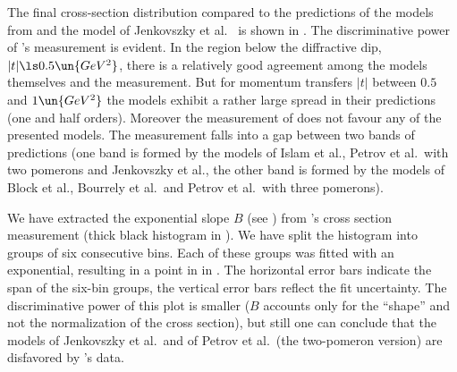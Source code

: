 The final cross-section distribution compared to the predictions of the models from  and the model of Jenkovszky et al.~ is shown in . The discriminative power of 's measurement is evident. In the region below the diffractive dip, $|t| \ls 0.5\un{GeV^2}$, there is a relatively good agreement among the models themselves and the measurement. But for momentum transfers $|t|$ between $0.5$ and $1\un{GeV^2}$ the models exhibit a rather large spread in their predictions (one and half orders). Moreover the measurement of  does not favour any of the presented models. The measurement falls into a gap between two bands of predictions (one band is formed by the models of Islam et al., Petrov et al.~with two pomerons and Jenkovszky et al., the other band is formed by the models of Block et al., Bourrely et al.~and Petrov et al.~with three pomerons).


We have extracted the exponential slope $B$ (see ) from 's cross section measurement (thick black histogram in ). We have split the histogram into groups of six consecutive bins. Each of these groups was fitted with an exponential, resulting in a point in in . The horizontal error bars indicate the span of the six-bin groups, the vertical error bars reflect the fit uncertainty. The discriminative power of this plot is smaller ($B$ accounts only for the ``shape'' and not the normalization of the cross section), but still one can conclude that the models of Jenkovszky et al.~and of Petrov et al.~(the two-pomeron version) are disfavored by 's data.

